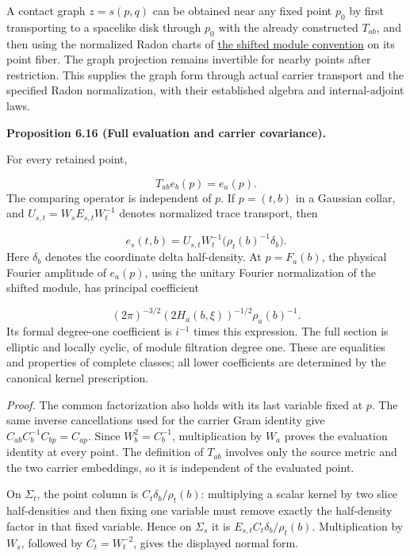 \documentclass[
  english,
  11pt,
  reqno]{amsart}
\makeatletter
\newcommand{\pandocstatementheading}[1]{%
  \par\addpenalty{\@beginparpenalty}%
  \addvspace{.5\baselineskip plus .2\baselineskip minus .2\baselineskip}%
  {\normalfont\bfseries #1\par}%
  \nobreak\@afterindenttrue\@afterheading
}
\makeatother
\begin{document}
A contact graph \(z=s(p,q)\) can be obtained near any fixed point
\(p_0\) by first transporting to a spacelike disk through \(p_0\) with
the already constructed \(T_{ab}\), and then using the normalized Radon
charts of \hyperref[prop:online-shifted-sky-modules]{the shifted module
convention} on its point fiber. The graph projection remains invertible
for nearby points after restriction. This supplies the graph form
through actual carrier transport and the specified Radon normalization,
with their established algebra and internal-adjoint laws.

\pandocstatementheading{\leavevmode{}\label{prop:online-wave-full-evaluation-comparison}Proposition 6.16 (Full evaluation and carrier covariance).}

For every retained point,

\label{eq:online-wave-full-evaluation-intertwining} \[
T_{ab}e_b(p)=e_a(p).
\] The comparing operator is independent of \(p\). If \(p=(t,b)\) in a
Gaussian collar, and \(U_{s,t}=W_sE_{s,t}W_t^{-1}\) denotes normalized
trace transport, then

\label{eq:online-wave-evaluation-gaussian-normal-form} \[
e_s(t,b)
=U_{s,t}W_t^{-1}
  \bigl(\rho_t(b)^{-1}\delta_b\bigr).
\] Here \(\delta_b\) denotes the coordinate delta half-density. At
\(p=F_a(b)\), the physical Fourier amplitude of \(e_a(p)\), using the
unitary Fourier normalization of the shifted module, has principal
coefficient

\label{eq:online-wave-evaluation-principal-amplitude} \[
(2\pi)^{-3/2}(2H_a(b,\xi))^{-1/2}\rho_a(b)^{-1}.
\] Its formal degree-one coefficient is \(i^{-1}\) times this
expression. The full section is elliptic and locally cyclic, of module
filtration degree one. These are equalities and properties of complete
classes; all lower coefficients are determined by the canonical kernel
prescription.

\emph{Proof.} The common factorization also holds with its last variable
fixed at \(p\). The same inverse cancellations used for the carrier Gram
identity give \(C_{ab}C_b^{-1}C_{bp}=C_{ap}\). Since \(W_b^2=C_b^{-1}\),
multiplication by \(W_a\) proves the evaluation identity at every point.
The definition of \(T_{ab}\) involves only the source metric and the two
carrier embeddings, so it is independent of the evaluated point.

On \(\Sigma_t\), the point column is \(C_t\delta_b/\rho_t(b)\):
multiplying a scalar kernel by two slice half-densities and then fixing
one variable must remove exactly the half-density factor in that fixed
variable. Hence on \(\Sigma_s\) it is \(E_{s,t}C_t\delta_b/\rho_t(b)\).
Multiplication by \(W_s\), followed by \(C_t=W_t^{-2}\), gives the
displayed normal form.
\end{document}

